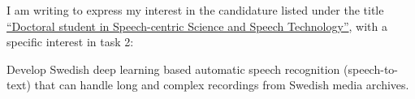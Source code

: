 \documentclass{article}[11pt]
\begin{document}



    
    
    
    

    
    

I am writing to express my interest in the candidature listed under the title \href{https://www.kth.se/en/om/work-at-kth/lediga-jobb/what:job/jobID:402029/where:4/}{``Doctoral student in Speech-centric Science and Speech Technology''}, with a specific interest in task 2:

\begin{displayquote}
Develop Swedish deep learning based automatic speech recognition (speech-to-text) that can handle long and complex recordings from Swedish media archives.
\end{displayquote}
\end{document}
